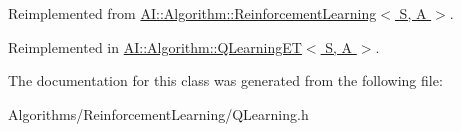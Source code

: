 Reimplemented from \hyperlink{classAI_1_1Algorithm_1_1ReinforcementLearning_a25d7fa245a79e61061436dc0f1db90cb}{A\+I\+::\+Algorithm\+::\+Reinforcement\+Learning$<$ S, A $>$}.



Reimplemented in \hyperlink{classAI_1_1Algorithm_1_1QLearningET_a9a245dcb3ca8f26b37e5a6daa6d4a898}{A\+I\+::\+Algorithm\+::\+Q\+Learning\+E\+T$<$ S, A $>$}.



The documentation for this class was generated from the following file\+:\begin{DoxyCompactItemize}
\item 
Algorithms/\+Reinforcement\+Learning/Q\+Learning.\+h\end{DoxyCompactItemize}
